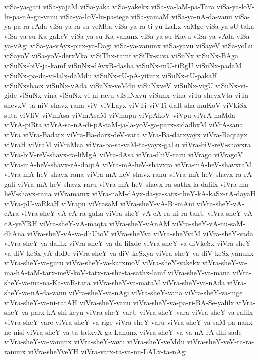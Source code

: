 {viSa-ya-gati
viSa-yajaM
viSa-yaka
viSa-yakekx
viSa-ya-laM-pa-Tara
viSa-ya-loV-lu-pa-nA-gu-vanu
viSa-ya-loV-lu-pa-tege
viSa-yamaM
viSa-ya-nA-da-vanu
viSa-ya-pa-ra-rAda
viSa-ya-ra-sa-veMba
viSa-ya-ra-ti-yu-LaLx-vaMge
viSa-ya-sU-taka
viSa-ya-su-Ka-gaLeV
viSa-ya-su-Ka-vanunx
viSa-ya-su-Kavu
viSa-ya-vAda
viSa-ya-vAgi
viSa-ya-vAyx-pitx-ya-Dagi
viSa-ya-vanunx
viSa-yavu
viSayeV
viSa-yoLu
viSayoV
viSa-yoV-derxVka
viSiThx-tamf
viSiTx-suva
viSuNx
viSuNx-BAga
viSuNx-biV-ja-kamf
viSuNx-dAvxR-dasha
viSuNx-mU-tiRgU
viSuNx-padaM
viSuNx-pa-da-vi-lalx-daMdu
viSuNx-rU-pA-yitutx
viSuNx-rU-pakaH
viSuNxshacx
viSuNx-vAda
viSuNx-veMdu
viSuNxveV
viSuNx-vigU
viSuNx-vi-gide
viSuNx-vina
viSuNx-vi-ni-ravu
viSuNxvu
viSunx-vina
viTa-shevxVta
viTa-shevxV-ta-niV-shavx-rana
viV
viVLayx
viVTi
viVTi-daR-sha-muKoV
viVkiSx-suta
viVliV
viVmAsa
viVmAsaM
viVmapu
viVpAkoV
viVpu
viVrA-naMda
viVrA-piRta
viVrA-sa-nA-di-pA-taM-ja-la-yoV-ga-parx-sidadhxM
viVrA-sana
viVra
viVra-Badarx
viVra-Ba-darx-deV-vara
viVra-Ba-darxyayx
viVra-Baqtayx
viVraH
viVraM
viVraMca
viVra-ba-sa-vaM-ta-yayx-gaLu
viVra-biV-reV-shavxra
viVra-biV-reV-shavx-ra-liMgA
viVra-dAsa
viVra-dhiV-raru
viVrago
viVragoV
viVra-mA-heV-shavx-rA-daqtA
viVra-mA-heV-shavxra
viVra-mA-heV-shavxraM
viVra-mA-heV-shavx-rana
viVra-mA-heV-shavx-ranu
viVra-mA-heV-shavx-ra-rA-gali
viVra-mA-heV-shavx-raru
viVra-mA-heV-shavx-ra-sathx-la-dalilx
viVra-ma-heV-shavx-rana
viVramamx
viVra-naM-dAyx-da-ya-satx-theY-kA-kaSx-rA-dayaH
viVra-pU-vaRkaH
viVrapu
viVrasaM
viVra-sheY-vA-Bi-mAni
viVra-sheY-vA-cAra
viVra-sheY-vA-cA-ra-gaLa
viVra-sheY-vA-cA-ra-ni-ra-tanU
viVra-sheY-vA-cA-yeYRH
viVra-sheY-vA-maqta
viVra-sheY-vAnAM
viVra-sheY-vA-nu-saM-dhAna
viVra-sheY-vA-va-dhUtoV
viVra-sheYva
viVra-sheYvaM
viVra-sheY-vada
viVra-sheY-va-dalilx
viVra-sheY-va-da-lilxde
viVra-sheY-va-diVkeSx
viVra-sheY-va-diV-keSx-yA-doDe
viVra-sheY-va-diV-keSxya
viVra-sheY-va-diV-keSx-yanunx
viVra-sheY-va-guru
viVra-sheY-va-karxmoV
viVra-sheY-vakekx
viVra-sheY-va-ma-hA-taM-tarx-meV-koV-tatx-ra-sha-ta-sathx-lamf
viVra-sheY-va-mana
viVra-sheY-va-ma-na-Ka-vaR-tara
viVra-sheY-va-mataM
viVra-sheY-va-nAda
viVra-sheY-va-nA-da-vanu
viVra-sheY-va-nAgi
viVra-sheY-vana
viVra-sheY-va-nige
viVra-sheY-va-ni-ratAH
viVra-sheY-vanu
viVra-sheY-va-pa-ri-BA-Se-yalilx
viVra-sheY-va-parx-kA-shi-keyu
viVra-sheY-varU
viVra-sheY-vara
viVra-sheY-va-ralilx
viVra-sheY-vare
viVra-sheY-va-rige
viVra-sheY-varu
viVra-sheY-va-saM-pa-nanx-ne-nisi
viVra-sheY-va-ta-tatxvX-ga-Lanunx
viVra-sheY-va-va-nA-rA-dhi-sade
viVra-sheY-va-vanunx
viVra-sheY-vavu
viVra-sheY-veMdu
viVra-sheY-veV-ta-ra-ranunx
viVra-sheYveYH
viVra-varx-ta-va-nu-LALx-ta-nAgi
}
